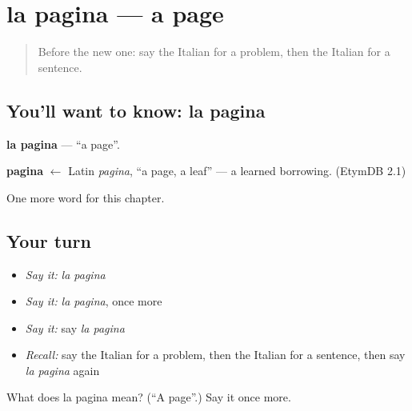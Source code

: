 \section[la pagina]{la pagina — a page}

\label{lesson:IT-C115-pagina}



\begin{quote}
Before the new one: say the Italian for a problem, then the Italian for a sentence.
\end{quote}

\subsection*{You'll want to know: la pagina}
\textbf{la pagina} — \textquotedblleft{}a page\textquotedblright{}.

\begin{cousinweb}
\textbf{pagina} $\leftarrow$ Latin \emph{pagina}, \textquotedblleft{}a page, a leaf\textquotedblright{} — a learned borrowing. (EtymDB 2.1)
\end{cousinweb}

\begin{grammarlens}[title={What you've built}]
One more word for this chapter.
\end{grammarlens}

\subsection*{Your turn}
\begin{itemize}
\raggedright
  \item \emph{Say it:} \emph{la pagina}
  \item \emph{Say it:} \emph{la pagina}, once more
  \item \emph{Say it:} say \emph{la pagina}
  \item \emph{Recall:} say the Italian for a problem, then the Italian for a sentence, then say \emph{la pagina} again
\end{itemize}

\begin{tcolorbox}[breakable,colback=teal!4,colframe=teal!35!black,title={Before you move on}]
What does la pagina mean? (\textquotedblleft{}A page\textquotedblright{}.) Say it once more.
\end{tcolorbox}
